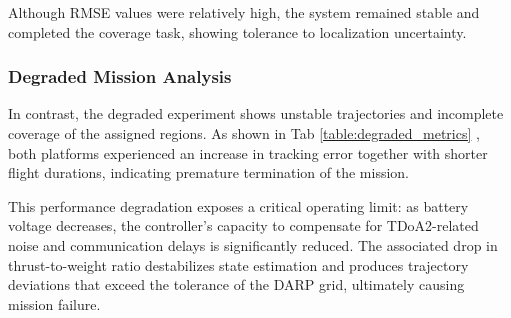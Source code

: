 \documentclass[conference]{IEEEtran}
\begin{document}
\begin{table}[H]
\centering
\caption{Nominal Flight Performance Metrics}
\label{table:nominal_metrics}
\end{table}

Although RMSE values were relatively high, the system remained stable and completed the coverage task, showing tolerance to localization uncertainty.

\subsubsection{Degraded Mission Analysis}


In contrast, the degraded experiment shows unstable trajectories and incomplete coverage of the assigned regions. As shown in Tab \ref{table:degraded_metrics} , both platforms experienced an increase in tracking error together with shorter flight durations, indicating premature termination of the mission.

\begin{table}[H]
\centering
\caption{Degraded Flight Performance Metrics (Failure Case)}
\label{table:degraded_metrics}
\end{table}

This performance degradation exposes a critical operating limit: as battery voltage decreases, the controller’s capacity to compensate for TDoA2-related noise and communication delays is significantly reduced. The associated drop in thrust-to-weight ratio destabilizes state estimation and produces trajectory deviations that exceed the tolerance of the DARP grid, ultimately causing mission failure.
\end{document}
